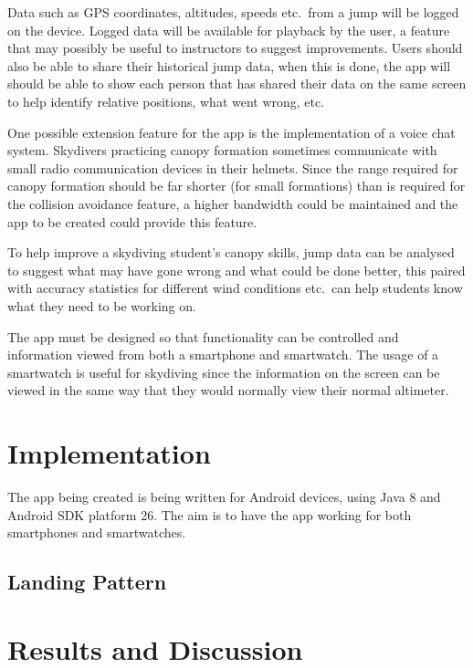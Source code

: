 \documentclass[11pt, twocolumn]{article}
\begin{document}
Data such as GPS coordinates, altitudes, speeds etc.\ from a jump will be logged on the device. Logged data will be available for playback by the user, a feature that may possibly be useful to instructors to suggest improvements. Users should also be able to share their historical jump data, when this is done, the app will should be able to show each person that has shared their data on the same screen to help identify relative positions, what went wrong, etc.

One possible extension feature for the app is the implementation of a voice chat system. Skydivers practicing canopy formation sometimes communicate with small radio communication devices in their helmets. Since the range required for canopy formation should be far shorter (for small formations) than is required for the collision avoidance feature, a higher bandwidth could be maintained and the app to be created could provide this feature.

To help improve a skydiving student's canopy skills, jump data can be analysed to suggest what may have gone wrong and what could be done better, this paired with accuracy statistics for different wind conditions etc.\ can help students know what they need to be working on.

The app must be designed so that functionality can be controlled and information viewed from both a smartphone and smartwatch. The usage of a smartwatch is useful for skydiving since the information on the screen can be viewed in the same way that they would normally view their normal altimeter.

\section{Implementation}\label{sec:implementation} %
The app being created is being written for Android devices, using Java 8 and Android SDK platform 26. The aim is to have the app working for both smartphones and smartwatches.

\subsection{Landing Pattern} %


\section{Results and Discussion}\label{sec:results-discussion} %
\end{document}
